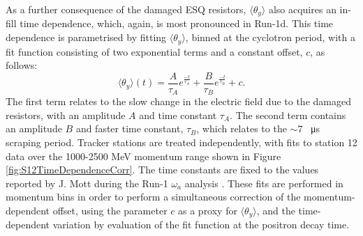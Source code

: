 As a further consequence of the damaged ESQ resistors, $\langle \theta_{y} \rangle$ also acquires an in-fill time dependence, which, again, is most pronounced in Run-1d. This time dependence is parametrised by fitting $\langle \theta_{y} \rangle$, binned at the cyclotron period, with a fit function consisting of two exponential terms and a constant offset, $c$, as follows:
%
\begin{equation}
  \langle \theta_{y} \rangle (t) = \frac{A}{\tau_{A}}e^{\frac{-t}{\tau_{A}}}+\frac{B}{\tau_{B}}e^{\frac{-t}{\tau_{B}}} + c.
  \label{eqn:DoubleExponential}
\end{equation}
% 
The first term relates to the slow change in the electric field due to the damaged resistors, with an amplitude $A$ and time constant $\tau_{A}$. The second term contains an amplitude $B$ and faster time constant, $\tau_{B}$, which relates to the $\sim7$ \SI{}{\micro\second} scraping period. Tracker stations are treated independently, with fits to station 12 data over the 1000-2500 MeV momentum range shown in Figure \ref{fig:S12TimeDependenceCorr}. The time constants are fixed to the values reported by J. Mott during the Run-1 $\omega_{a}$ analysis \cite{MottTimeConstants}. These fits are performed in momentum bins in order to perform a simultaneous correction of the momentum-dependent offset, using the parameter $c$ as a proxy for $\langle \theta_{y} \rangle$, and the time-dependent variation by evaluation of the fit function at the positron decay time. 


